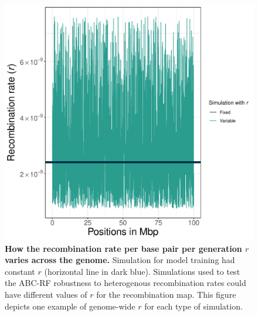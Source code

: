 \documentclass[a4paper, 12pt]{article}
\begin{document}
\begin{figure}[ht]
 \centering
 \includegraphics[width=1\textwidth]{Figures/FigureS4_example_variable_recomb.pdf}
 \small\caption{\textbf{How the recombination rate per base pair per generation $r$ varies across the genome.} Simulation for model training had constant $r$ (horizontal line in dark blue). Simulations used to test the ABC-RF robustness to heterogenous recombination rates could have different values of $r$ for the recombination map. This figure depicts one example of genome-wide $r$ for each type of simulation.}
 \label{fig:supple_example_recomb}
\end{figure}
\end{document}
